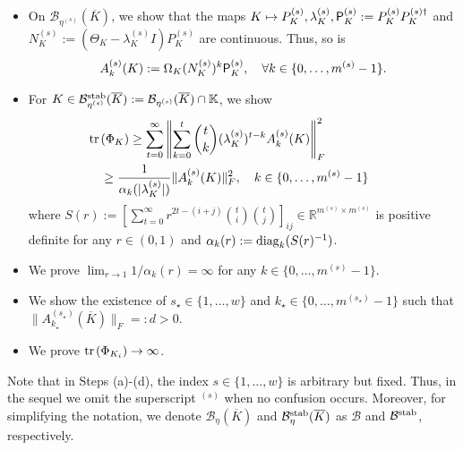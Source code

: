 \documentclass[preprint,5p,times,twocolumn]{elsarticle}
\def\tr{{\rm tr} \hspace{0.5mm}}
\begin{document}
\begin{itemize}
    \item[(a)] On $\mathcal B_{\eta^{(s)}}(\overline{K})$, we show that the maps $K \mapsto P^{(s)}_K, \lambda^{(s)}_K, {\sf P}^{(s)}_K := P_K^{(s)}P_K^{(s)\dagger}$ and $N_K^{(s)} := (\Theta_K - \lambda_K^{(s)}I)P^{(s)}_K$ are continuous. Thus, so is 
    \begin{align}\label{def_Aks}
        A_k^{(s)}(K) := \Omega_K (N^{(s)}_K)^{k}{\sf P}_K^{(s)}, \quad \forall k \in \{0,\dots,m^{(s)}-1\}. 
    \end{align}

    \item[(b)] For $K \in \mathcal B^{\rm stab}_{\eta^{(s)}}(\overline{K}) := \mathcal B_{\eta^{(s)}}(\overline{K}) \cap \mathbb K$, we show 
    \begin{align}
    \hspace{-8mm}\tr(\Phi_K) &\geq \sum_{t=0}^{\infty}\left\|\sum_{k=0}^t \binom{t}{k}(\lambda^{(s)}_K)^{t-k}A_k^{(s)}(K)\right\|_F^2 \label{lb01} \\
    &\hspace{-8mm} \geq \frac{1}{\alpha_k(|\lambda_K^{(s)}|)} \|A_k^{(s)}(K)\|_F^2,\quad  k\in\{0,\ldots,m^{(s)}-1\} \label{lb02}
\end{align}
where $S(r) := \left[\sum_{t=0}^{\infty}r^{2t - (i+j)} \binom{t}{i} \binom{t}{j}\right]_{ij} \in \mathbb R^{m^{(s)} \times m^{(s)}}$ is positive definite for any $r \in (0,1)$ and $\alpha_k(r) := {\rm diag}_k(S(r)^{-1})$. 

\item[(c)] We prove $\lim_{r \to 1} 1/\alpha_k(r) = \infty$ for any $k \in \{0, \ldots, m^{(s)}-1\}$. 

\item[(d)] We show the existence of $s_{\star} \in \{1,\dots,w\}$ and $k_{\star} \in \{0, \ldots, m^{(s_{\star})}-1\}$ such that $\|A_{k_{\star}}^{(s_{\star})}(\overline{K})\|_F =: d >0$. 

\item[(e)] We prove $\tr(\Phi_{K_i}) \to \infty$. 
\end{itemize}
Note that in Steps (a)-(d), the index $s \in \{1, \dots, w\}$ is arbitrary but fixed. Thus, in the sequel we omit the superscript $^{(s)}$ when no confusion occurs. Moreover, for simplifying the notation, we denote $\mathcal B_\eta(\overline K)$ and $\mathcal B^{\rm stab}_\eta(\overline K)$  as $\mathcal B$ and $\mathcal B^{\rm stab}$, respectively.  
\end{document}
